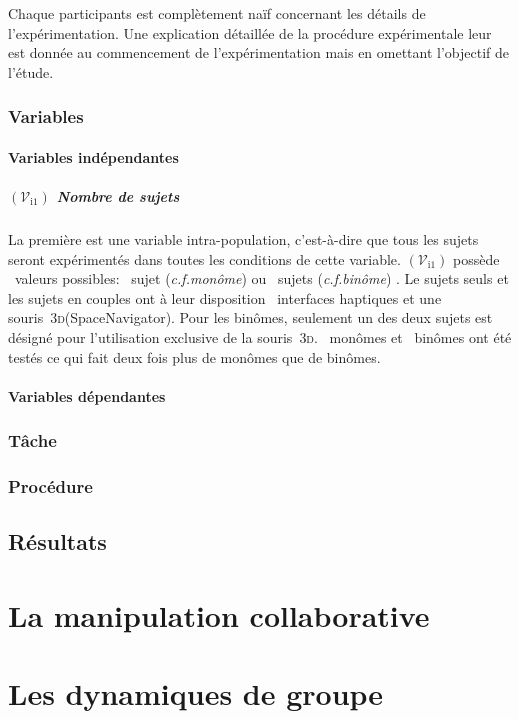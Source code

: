\documentclass[myfrancais]{mythesis}
\newcommand{\mynum}[1]{\nombre{#1}}
\newcommand{\myvar}[2]{$\left(\mathcal{V}_{\mathrm{#1}#2}\right)$\xspace}
\newcommand{\myvari}[1]{\myvar{i}{#1}}
\newcommand{\myemph}[1]{\emph{#1}}
\newcommand{\myThreeD}{\textsc{3d}\xspace}
\newcommand{\myregistered}{\textsuperscript{\textregistered}}
\newcommand{\mySpaceNavigator}{SpaceNavigator\myregistered\xspace}
\newcommand{\mycf}{\textit{c.f.}\xspace}
\begin{document}
	Chaque participants est complètement naïf concernant les détails de l'expérimentation.
	Une explication détaillée de la procédure expérimentale leur est donnée au commencement de l'expérimentation mais en omettant l'objectif de l'étude.

	\subsection{Variables}
	\subsubsection{Variables indépendantes}
	\paragraph{\myvari{1} Nombre de sujets}
	La première  est une variable intra-population, c'est-à-dire que tous les sujets seront expérimentés dans toutes les conditions de cette variable.
	\myvari{1} possède \mynum{2}~valeurs possibles: \og \mynum{1}~sujet (\mycf \myemph{monôme}) \fg ou \og \mynum{2}~sujets (\mycf \myemph{binôme}) \fg.
	Le sujets seuls et les sujets en couples ont à leur disposition \mynum{2}~interfaces haptiques et une souris~\myThreeD (\mySpaceNavigator).
	Pour les binômes, seulement un des deux sujets est désigné pour l'utilisation exclusive de la souris~\myThreeD.
	\mynum{24}~monômes et \mynum{12}~binômes ont été testés ce qui fait deux fois plus de monômes que de binômes.

	\subsubsection{Variables dépendantes}
	\subsection{Tâche}
	\subsection{Procédure}
	\section{Résultats}
	\chapter{La manipulation collaborative}
	\chapter{Les dynamiques de groupe}
\end{document}

